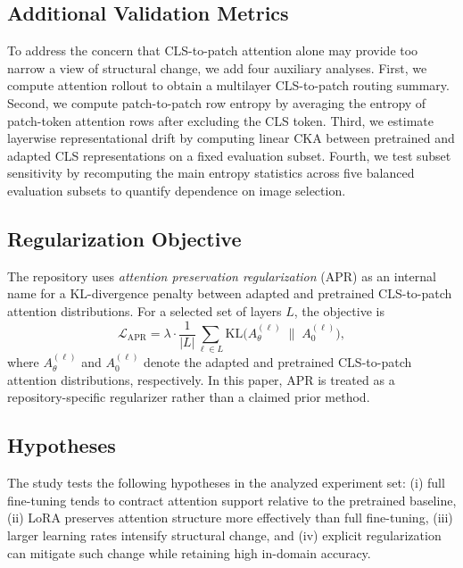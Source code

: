 \documentclass[10pt]{article}
\begin{document}
\subsection{Additional Validation Metrics}
To address the concern that CLS-to-patch attention alone may provide too narrow a view of structural change, we add four auxiliary analyses. First, we compute attention rollout \citep{abnar2020quantifying} to obtain a multilayer CLS-to-patch routing summary. Second, we compute patch-to-patch row entropy by averaging the entropy of patch-token attention rows after excluding the CLS token. Third, we estimate layerwise representational drift by computing linear CKA between pretrained and adapted CLS representations on a fixed evaluation subset. Fourth, we test subset sensitivity by recomputing the main entropy statistics across five balanced evaluation subsets to quantify dependence on image selection.

\subsection{Regularization Objective}
The repository uses \emph{attention preservation regularization} (APR) as an internal name for a KL-divergence penalty between adapted and pretrained CLS-to-patch attention distributions. For a selected set of layers $L$, the objective is
\begin{equation}
\mathcal{L}_{\mathrm{APR}} = \lambda \cdot \frac{1}{|L|} \sum_{\ell \in L}
\mathrm{KL}\big(A_{\theta}^{(\ell)} \;\|\; A_{0}^{(\ell)}\big),
\end{equation}
where $A_{\theta}^{(\ell)}$ and $A_{0}^{(\ell)}$ denote the adapted and pretrained CLS-to-patch attention distributions, respectively. In this paper, APR is treated as a repository-specific regularizer rather than a claimed prior method.

\subsection{Hypotheses}
The study tests the following hypotheses in the analyzed experiment set: (i) full fine-tuning tends to contract attention support relative to the pretrained baseline, (ii) LoRA preserves attention structure more effectively than full fine-tuning, (iii) larger learning rates intensify structural change, and (iv) explicit regularization can mitigate such change while retaining high in-domain accuracy.
\end{document}
